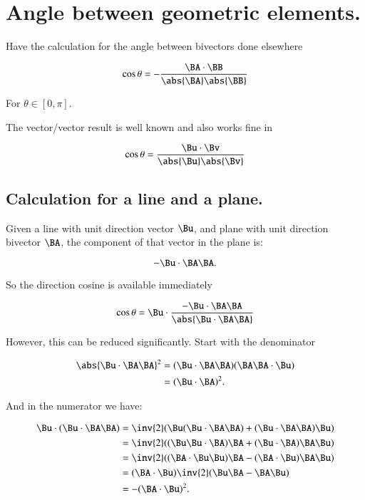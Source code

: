 \chapter{Angle between geometric elements.}
\label{chap:angleBetweenLineAndPlane}
\date{Mar 17, 2008.  angleBetweenLineAndPlane.tex}

Have the calculation for the angle between bivectors done elsewhere

\begin{equation}\label{eqn:angleLinePlane:bivectorangle}
\cos\theta = - \frac{\BA \cdot \BB}{\abs{\BA} \abs{\BB} }
\end{equation}

For $\theta \in [0,\pi]$.

The vector/vector result is well known and also works fine in 

\begin{equation}\label{eqn:angleLinePlane:vectorangle}
\cos\theta = \frac{\Bu \cdot \Bv}{\abs{\Bu} \abs{\Bv} }
\end{equation}

\section{Calculation for a line and a plane.}

Given a line with unit direction vector $\Bu$, and plane with unit direction bivector $\BA$, the component of that
vector in the plane is:

\[
-\Bu \cdot \BA \BA.
\]

So the direction cosine is available immediately

\[
\cos\theta = \Bu \cdot \frac{-\Bu \cdot \BA \BA}{\abs{\Bu \cdot \BA \BA}}
\]

However, this can be reduced significantly.  Start with the denominator

\begin{align*}
\abs{\Bu \cdot \BA \BA}^2
&= (\Bu \cdot \BA \BA)(\BA \BA \cdot \Bu) \\
&= (\Bu \cdot \BA )^2. \\
\end{align*}

And in the numerator we have:

\begin{align*}
\Bu \cdot (\Bu \cdot \BA \BA)
&= \inv{2}(
  \Bu (\Bu \cdot \BA \BA)
+ (\Bu \cdot \BA \BA) \Bu 
) \\
&= \inv{2}(
  (\Bu \Bu \cdot \BA) \BA
+ (\Bu \cdot \BA) \BA \Bu 
) \\
&= \inv{2}(
  (\BA \cdot \Bu \Bu) \BA
- (\BA \cdot \Bu) \BA \Bu 
) \\
&= (\BA \cdot \Bu) \inv{2}( \Bu \BA - \BA \Bu ) \\
&= -(\BA \cdot \Bu)^2.
\end{align*}

